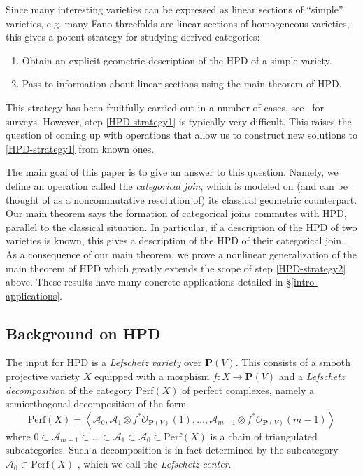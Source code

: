 \documentclass[11pt, reqno]{amsart}
\numberwithin{equation}{section}
\theoremstyle{plain}
\theoremstyle{definition}
\newcommand{\Perf}{\mathrm{Perf}}
\newcommand{\llangle}{\left \langle}
\newcommand{\rrangle}{\right \rangle}
\newcommand{\cO}{\mathcal{O}}
\newcommand{\cA}{\mathcal{A}}
\newcommand{\bP}{\mathbf{P}}
\begin{document}
 Since many interesting varieties can be expressed as linear sections of ``simple'' varieties, 
 e.g. many Fano threefolds are linear sections of homogeneous varieties, 
 this gives a potent strategy for studying derived categories: 
 \begin{enumerate}
 \item \label{HPD-strategy1} Obtain an explicit geometric description of the HPD of a simple variety. 
 \item \label{HPD-strategy2} Pass to 
 information about linear sections using the main theorem of HPD. 
 \end{enumerate}
 This strategy has been fruitfully carried out in a number of cases, 
 see~\cite{kuznetsov2014semiorthogonal, thomas2015notes} for surveys. 
 However, step \eqref{HPD-strategy1} is typically very difficult. 
 This raises the question of coming up with operations that allow us to construct 
 new solutions to \eqref{HPD-strategy1} from known ones. 

The main goal of this paper is to give an answer to this question. 
Namely, we define an operation called the \emph{categorical join}, which is modeled 
on (and can be thought of as a noncommutative resolution of) its classical geometric counterpart. 
Our main theorem says 
the formation of categorical joins commutes with HPD, parallel to the classical situation. 
In particular, if a description of the HPD of two varieties is known, this gives a description 
of the HPD of their categorical join. 
As a consequence of our main theorem, we prove a nonlinear generalization of the main theorem of HPD which greatly extends the scope of step \eqref{HPD-strategy2} above. 
These results have many concrete applications
detailed in \S\ref{intro-applications}. 

\subsection{Background on HPD} 
\label{subsection-NCHPD} 

The input for HPD is a \emph{Lefschetz variety} over $\bP(V)$.
This consists of a smooth projective variety $X$ equipped with a morphism $f \colon X \to \bP(V)$ 
and a \emph{Lefschetz decomposition} of the category $\Perf(X)$ 
of perfect complexes, namely a semiorthogonal decomposition of the form 
\begin{equation*}
\Perf(X) = \llangle \cA_0, 
\cA_1 \otimes f^*\cO_{\bP(V)}(1), \dots, \cA_{m-1} \otimes f^*\cO_{\bP(V)}(m-1) \rrangle 
\end{equation*}
where 
$0 \subset \cA_{m-1} \subset \dots \subset \cA_1 \subset \cA_0 \subset \Perf(X)$
is a chain of triangulated subcategories. 
Such a decomposition is in fact determined by the subcategory $\cA_0 \subset \Perf(X)$ \cite[Lemma~2.18]{kuznetsov2008lefschetz}, 
which we call the \emph{Lefschetz center}.
\end{document}
